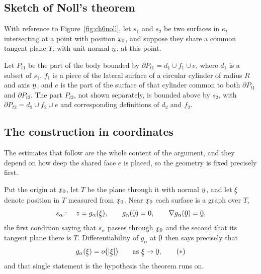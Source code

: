 \subsection*{Sketch of Noll's theorem}

With reference to Figure~\ref{fig:ch6noll}, let $s_{1}$ and $s_{2}$ be
two surfaces in $\kappa_{t}$ intersecting at a point with position
$\bx_{0}$, and suppose they share a common tangent plane $T$, with unit
normal $\bn$, at this point.

Let $P_{t1}$ be the part of the body bounded by
$\partial P_{t1}=d_{1}\cup f_{1}\cup e$, where $d_{1}$ is a subset of
$s_{1}$, $f_{1}$ is a piece of the lateral surface of a circular
cylinder of radius $R$ and axis $\bn$, and $e$ is the part of the
surface of that cylinder common to both $\partial P_{t1}$ and
$\partial P_{t2}$. The part $P_{t2}$, not shown separately, is bounded
above by $s_{2}$, with $\partial P_{t2}=d_{2}\cup f_{2}\cup e$ and
corresponding definitions of $d_{2}$ and $f_{2}$.

\subsection*{The construction in coordinates}

The estimates that follow are the whole content of the argument, and
they depend on how deep the shared face $e$ is placed, so the geometry
is fixed precisely first.

Put the origin at $\bx_{0}$, let $T$ be the plane through it with
normal $\bn$, and let $\vek{\xi}$ denote position in $T$ measured from
$\bx_{0}$. Near $\bx_{0}$ each surface is a graph over $T$,
\[
   s_{\alpha}:\quad z=g_{\alpha}(\vek{\xi}),\qquad
   g_{\alpha}(\bze)=0,\qquad \nabla g_{\alpha}(\bze)=\bze ,
\]
the first condition saying that $s_{\alpha}$ passes through $\bx_{0}$
and the second that its tangent plane there is $T$. Differentiability
of $g_{\alpha}$ at $\bze$ then says precisely that
\begin{equation}
   g_{\alpha}(\vek{\xi})=o\big(|\vek{\xi}|\big)
   \qquad\text{as }\vek{\xi}\to\bze ,
   \tag{$\ast$}\label{eq:ch6nolltan}
\end{equation}
and that single statement is the hypothesis the theorem runs on.

